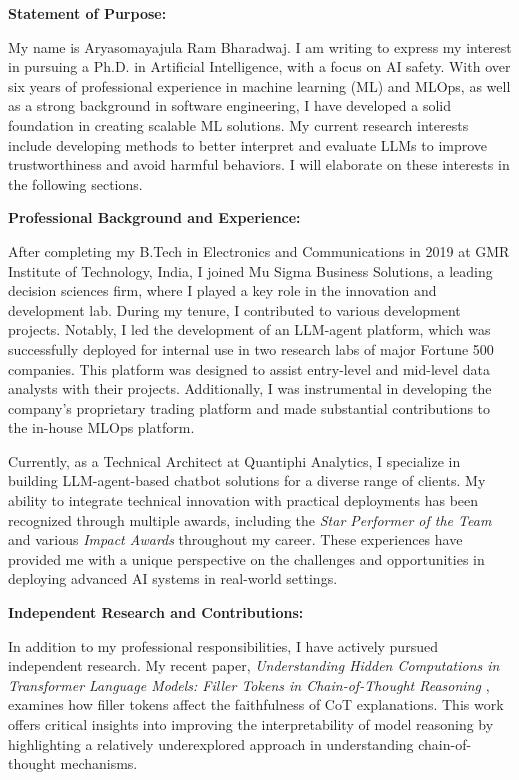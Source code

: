 \documentclass[12pt]{article}
\begin{document}
\textbf{Statement of Purpose:}

My name is Aryasomayajula Ram Bharadwaj. I am writing to express my interest in pursuing a Ph.D. in Artificial Intelligence, with a focus on AI safety. With over six years of professional experience in machine learning (ML) and MLOps, as well as a strong background in software engineering, I have developed a solid foundation in creating scalable ML solutions. My current research interests include developing methods to better interpret and evaluate LLMs to improve trustworthiness and avoid harmful behaviors. I will elaborate on these interests in the following sections.

\textbf{Professional Background and Experience:}

After completing my B.Tech in Electronics and Communications in 2019 at GMR Institute of Technology, India, I joined Mu Sigma Business Solutions, a leading decision sciences firm, where I played a key role in the innovation and development lab. During my tenure, I contributed to various development projects. Notably, I led the development of an LLM-agent platform, which was successfully deployed for internal use in two research labs of major Fortune 500 companies. This platform was designed to assist entry-level and mid-level data analysts with their projects. Additionally, I was instrumental in developing the company's proprietary trading platform and made substantial contributions to the in-house MLOps platform.

Currently, as a Technical Architect at Quantiphi Analytics, I specialize in building LLM-agent-based chatbot solutions for a diverse range of clients. My ability to integrate technical innovation with practical deployments has been recognized through multiple awards, including the \emph{Star Performer of the Team} and various \emph{Impact Awards} throughout my career. These experiences have provided me with a unique perspective on the challenges and opportunities in deploying advanced AI systems in real-world settings.

\newpage
\textbf{Independent Research and Contributions:}

In addition to my professional responsibilities, I have actively pursued independent research. My recent paper, \emph{Understanding Hidden Computations in Transformer Language Models: Filler Tokens in Chain-of-Thought Reasoning} \cite{bharadwaj2024}, examines how filler tokens affect the faithfulness of CoT explanations. This work offers critical insights into improving the interpretability of model reasoning by highlighting a relatively underexplored approach in understanding chain-of-thought mechanisms.
\end{document}
